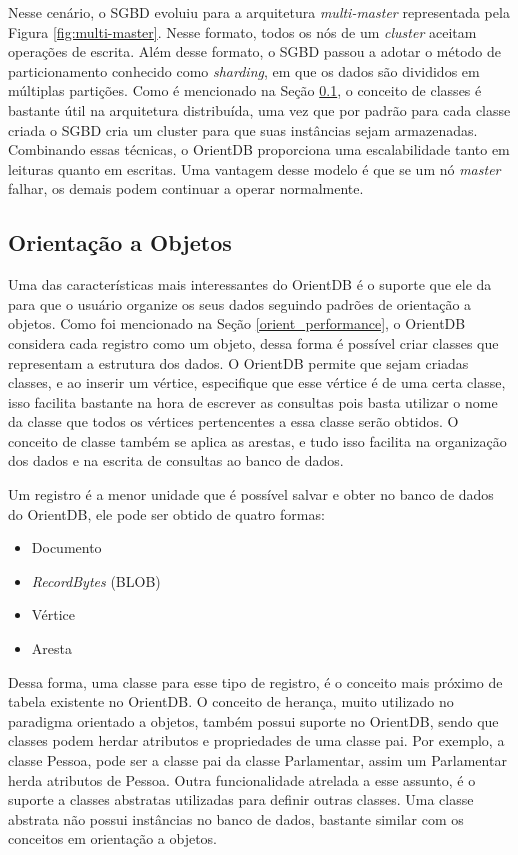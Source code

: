 	Nesse cenário, o SGBD evoluiu para a arquitetura \textit{multi-master} representada pela Figura \ref{fig:multi-master}. Nesse formato, todos os nós de um \textit{cluster} aceitam operações de escrita. Além desse formato, o SGBD passou a adotar o método de particionamento conhecido como \textit{sharding}, em que os dados são divididos em múltiplas partições. Como é mencionado na Seção \ref{orient_object}, o conceito de classes é bastante útil na arquitetura distribuída, uma vez que por padrão para cada classe criada o SGBD cria um cluster para que suas instâncias sejam armazenadas. Combinando essas técnicas, o OrientDB proporciona uma escalabilidade tanto em leituras quanto em escritas. Uma vantagem desse modelo é que se um nó \textit{master} falhar, os demais podem continuar a operar normalmente.

\subsection{Orientação a Objetos} \label{orient_object}

	Uma das características mais interessantes do OrientDB é o suporte que ele da para que o usuário organize os seus dados seguindo padrões de orientação a objetos. Como foi mencionado na Seção \ref{orient_performance}, o OrientDB considera cada registro como um objeto, dessa forma é possível criar classes que representam a estrutura dos dados. O OrientDB permite que sejam criadas classes, e ao inserir um vértice, especifique que esse vértice é de uma certa classe, isso facilita bastante na hora de escrever as consultas pois basta utilizar o nome da classe que todos os vértices pertencentes a essa classe serão obtidos. O conceito de classe também se aplica as arestas, e tudo isso facilita na organização dos dados e na escrita de consultas ao banco de dados.
	
	Um registro é a menor unidade que é possível salvar e obter no banco de dados do OrientDB, ele pode ser obtido de quatro formas:
	
	\begin{itemize}
		\item Documento
		\item \textit{RecordBytes} (BLOB)
		\item Vértice
		\item Aresta
	\end{itemize}
	
	Dessa forma, uma classe para esse tipo de registro, é o conceito mais próximo de tabela existente no OrientDB. O conceito de herança, muito utilizado no paradigma orientado a objetos, também possui suporte no OrientDB, sendo que classes podem herdar atributos e propriedades de uma classe pai. Por exemplo, a classe Pessoa, pode ser a classe pai da classe Parlamentar, assim um Parlamentar herda atributos de Pessoa. Outra funcionalidade atrelada a esse assunto, é o suporte a classes abstratas utilizadas para definir outras classes. Uma classe abstrata não possui instâncias no banco de dados, bastante similar com os conceitos em orientação a objetos. 
	
